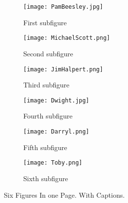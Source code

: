 \documentclass[12pt, oneside]{article}   	%
\begin{document}
\newpage
\begin{figure}[t!] %
\begin{subfigure}{0.4\textwidth}
\texttt{[image: PamBeesley.jpg]}
\caption{First subfigure} \label{fig:7a}
\end{subfigure}\hspace*{\fill}
\begin{subfigure}{0.4\textwidth}
\texttt{[image: MichaelScott.png]}
\caption{Second subfigure} \label{fig:7b}
\end{subfigure}

\medskip
\begin{subfigure}{0.4\textwidth}
\texttt{[image: JimHalpert.png]}
\caption{Third subfigure} \label{fig:7c}
\end{subfigure}\hspace*{\fill}
\begin{subfigure}{0.4\textwidth}
\texttt{[image: Dwight.jpg]}
\caption{Fourth subfigure} \label{fig:7d}
\end{subfigure}

\medskip
\begin{subfigure}{0.4\textwidth}
\texttt{[image: Darryl.png]}
\caption{Fifth subfigure} \label{fig:7e}
\end{subfigure}\hspace*{\fill}
\begin{subfigure}{0.4\textwidth}
\texttt{[image: Toby.png]}
\caption{Sixth subfigure} \label{fig:7f}
\end{subfigure}

\caption{Six Figures In one Page. With Captions.} 
\label{fig:7}
\end{figure}
\end{document}
